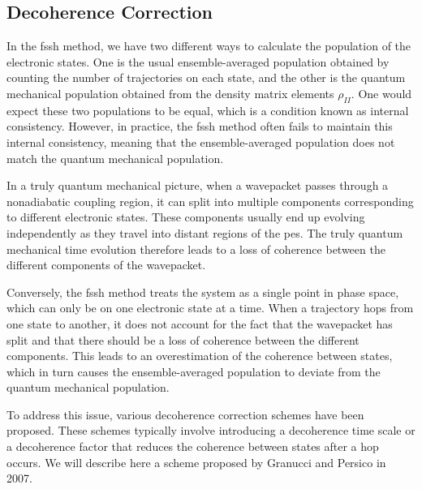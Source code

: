 \subsection{Decoherence Correction}
In the \acrshort{fssh} method, we have two different ways to calculate the population of the electronic states. One is the usual ensemble-averaged population obtained by counting the number of trajectories on each state, and the other is the quantum mechanical population obtained from the density matrix elements $\rho_{II}$. One would expect these two populations to be equal, which is a condition known as internal consistency. However, in practice, the \acrshort{fssh} method often fails to maintain this internal consistency, meaning that the ensemble-averaged population does not match the quantum mechanical population.\supercite{10.1063/1.474288,10.1063/1.1793991,10.1063/1.471791}

In a truly quantum mechanical picture, when a wavepacket passes through a nonadiabatic coupling region, it can split into multiple components corresponding to different electronic states. These components usually end up evolving independently as they travel into distant regions of the \acrshort{pes}. The truly quantum mechanical time evolution therefore leads to a loss of coherence between the different components of the wavepacket.

Conversely, the \acrshort{fssh} method treats the system as a single point in phase space, which can only be on one electronic state at a time. When a trajectory hops from one state to another, it does not account for the fact that the wavepacket has split and that there should be a loss of coherence between the different components. This leads to an overestimation of the coherence between states, which in turn causes the ensemble-averaged population to deviate from the quantum mechanical population.

To address this issue, various decoherence correction schemes have been proposed. These schemes typically involve introducing a decoherence time scale or a decoherence factor that reduces the coherence between states after a hop occurs.\supercite{10.1063/1.1793991,10.1021/acs.jctc.2c00988,10.1021/jp991602b} We will describe here a scheme proposed by Granucci and Persico in 2007.\supercite{10.1063/1.2715585}

